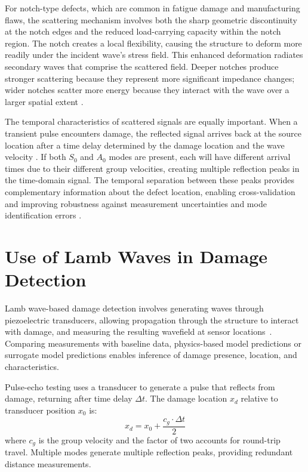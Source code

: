 \documentclass[12pt,a4paper]{report}
\begin{document}
For notch-type defects, which are common in fatigue damage and manufacturing flaws, the scattering mechanism involves both the sharp geometric discontinuity at the notch edges and the reduced load-carrying capacity within the notch region. The notch creates a local flexibility, causing the structure to deform more readily under the incident wave's stress field. This enhanced deformation radiates secondary waves that comprise the scattered field. Deeper notches produce stronger scattering because they represent more significant impedance changes; wider notches scatter more energy because they interact with the wave over a larger spatial extent \citep{cawley2018practical, KIM2011734}.

The temporal characteristics of scattered signals are equally important. When a transient pulse encounters damage, the reflected signal arrives back at the source location after a time delay determined by the damage location and the wave velocity \citep{rose2014ultrasonic}. If both $S_0$ and $A_0$ modes are present, each will have different arrival times due to their different group velocities, creating multiple reflection peaks in the time-domain signal. The temporal separation between these peaks provides complementary information about the defect location, enabling cross-validation and improving robustness against measurement uncertainties and mode identification errors \citep{na2021review}.

\section{Use of Lamb Waves in Damage Detection}

Lamb wave-based damage detection involves generating waves through piezoelectric transducers, allowing propagation through the structure to interact with damage, and measuring the resulting wavefield at sensor locations~\cite{giurgiutiu2005}. Comparing measurements with baseline data, physics-based model predictions or surrogate model predictions enables inference of damage presence, location, and characteristics.

Pulse-echo testing uses a transducer to generate a pulse that reflects from damage, returning after time delay $\Delta t$. The damage location $x_d$ relative to transducer position $x_0$ is:
\begin{equation}
x_d = x_0 + \frac{c_g \cdot \Delta t}{2}
\end{equation}
where $c_g$ is the group velocity and the factor of two accounts for round-trip travel. Multiple modes generate multiple reflection peaks, providing redundant distance measurements.
\end{document}
